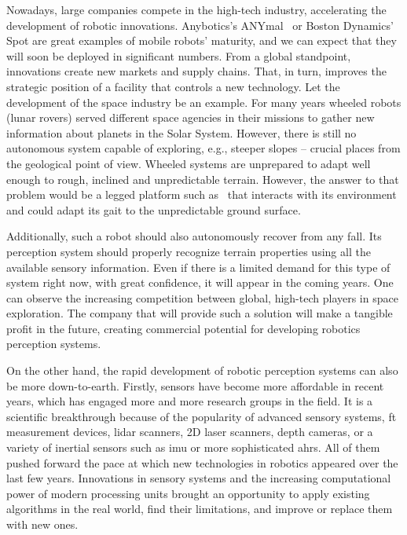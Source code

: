 \documentclass[a4paper, 10pt, twoside]{report}
\begin{document}
Nowadays, large companies compete in the high-tech industry, accelerating the development of robotic innovations. Anybotics's ANYmal~\cite{anymal} or Boston Dynamics' Spot are great examples of mobile robots' maturity, and we can expect that they will soon be deployed in significant numbers. From a global standpoint, innovations create new markets and supply chains. That, in turn, improves the strategic position of a facility that controls a new technology. Let the development of the space industry be an example. For many years wheeled robots (\eg lunar rovers) served different space agencies in their missions to gather new information about planets in the Solar System. However, there is still no autonomous system capable of exploring, e.g., steeper slopes -- crucial places from the geological point of view. Wheeled systems are unprepared to adapt well enough to rough, inclined and unpredictable terrain. However, the answer to that problem would be a legged platform such as~\cite{spacebok} that interacts with its environment and could adapt its gait to the unpredictable ground surface.

Additionally, such a robot should also autonomously recover from any fall. Its perception system should properly recognize terrain properties using all the available sensory information. Even if there is a limited demand for this type of system right now, with great confidence, it will appear in the coming years. One can observe the increasing competition between global, high-tech players in space exploration. The company that will provide such a solution will make a tangible profit in the future, creating commercial potential for developing robotics perception systems.

On the other hand, the rapid development of robotic perception systems can also be more down-to-earth. Firstly, sensors have become more affordable in recent years, which has engaged more and more research groups in the field. It is a scientific breakthrough because of the popularity of advanced sensory systems, \eg \acrshort{ft} measurement devices, \acrfull{lidar} scanners, 2D laser scanners, depth cameras, or a variety of inertial sensors such as \acrfull{imu} or more sophisticated \acrfull{ahrs}. All of them pushed forward the pace at which new technologies in robotics appeared over the last few years. Innovations in sensory systems and the increasing computational power of modern processing units brought an opportunity to apply existing algorithms in the real world, find their limitations, and improve or replace them with new ones. 
\end{document}
